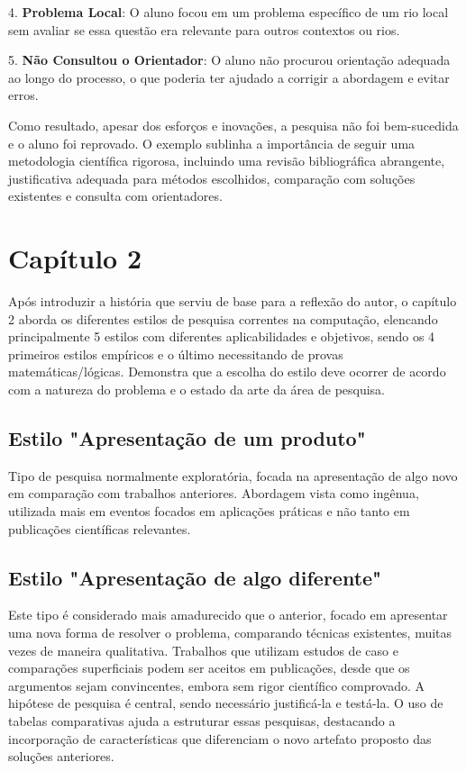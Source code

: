 \documentclass[
	12pt,				%
	openright,			%
	oneside,			%
	a4paper,			%
	chapter=TITLE,		%
	subsection=TITLE,	%
	english,			%
	brazilian,				%
	]{abntex2}
\begin{document}
4. \textbf{Problema Local}: O aluno focou em um problema específico de um rio local sem avaliar se essa questão era relevante para outros contextos ou rios.

5. \textbf{Não Consultou o Orientador}: O aluno não procurou orientação adequada ao longo do processo, o que poderia ter ajudado a corrigir a abordagem e evitar erros.

Como resultado, apesar dos esforços e inovações, a pesquisa não foi bem-sucedida e o aluno foi reprovado. O exemplo sublinha a importância de seguir uma metodologia científica rigorosa, incluindo uma revisão bibliográfica abrangente, justificativa adequada para métodos escolhidos, comparação com soluções existentes e consulta com orientadores.

\section*{Capítulo 2}
Após introduzir a história que serviu de base para a reflexão do autor, o capítulo 2 aborda os diferentes estilos de pesquisa correntes na computação, elencando principalmente 5 estilos com diferentes aplicabilidades e objetivos, sendo os 4 primeiros estilos empíricos e o último necessitando de provas matemáticas/lógicas. Demonstra que a escolha do estilo deve ocorrer de acordo com a natureza do problema e o estado da arte da área de pesquisa.

\subsection*{Estilo "Apresentação de um produto"}
Tipo de pesquisa normalmente exploratória, focada na apresentação de algo novo em comparação com trabalhos anteriores. Abordagem vista como ingênua, utilizada mais em eventos focados em aplicações práticas e não tanto em publicações científicas relevantes.

\subsection*{Estilo "Apresentação de algo diferente"}
Este tipo é considerado mais amadurecido que o anterior, focado em apresentar uma nova forma de resolver o problema, comparando técnicas existentes, muitas vezes de maneira qualitativa. Trabalhos que utilizam estudos de caso e comparações superficiais podem ser aceitos em publicações, desde que os argumentos sejam convincentes, embora sem rigor científico comprovado. A hipótese de pesquisa é central, sendo necessário justificá-la e testá-la. O uso de tabelas comparativas ajuda a estruturar essas pesquisas, destacando a incorporação de características que diferenciam o novo artefato proposto das soluções anteriores.
\end{document}
